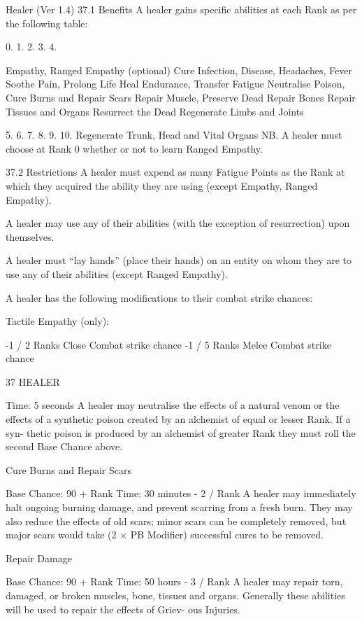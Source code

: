 \begin{Chapter}{Healer (Ver 1.4)}
37.1 Benefits 
A healer gains specific abilities at each Rank as per 
the following table: 

0. 
1. 
2. 
3. 
4. 

Empathy, Ranged Empathy (optional) 
Cure Infection, Disease, Headaches, Fever 
Soothe Pain, Prolong Life 
Heal Endurance, Transfer Fatigue 
Neutralise Poison, Cure Burns and Repair 
Scars 
Repair Muscle, Preserve Dead 
Repair Bones 
Repair Tissues and Organs 
Resurrect the Dead 
Regenerate Limbs and Joints 

5. 
6. 
7. 
8. 
9. 
10.  Regenerate Trunk, Head and Vital Organs 
NB.  A  healer  must  choose  at  Rank  0  whether  or 
not to learn Ranged Empathy. 

37.2 Restrictions 
A  healer  must  expend  as  many  Fatigue  Points  as 
the Rank at which they acquired the ability they are 
using (except Empathy, Ranged Empathy). 

A  healer  may  use  any  of  their  abilities  (with  the 
exception of resurrection) upon themselves. 

A  healer  must  “lay  hands”  (place  their  hands)  on 
an  entity  on  whom  they  are  to  use  any  of  their 
abilities (except Ranged Empathy). 

A  healer  has  the  following  modifications  to  their 
combat strike chances: 

Tactile Empathy (only): 

-1 / 2 Ranks  Close Combat strike chance 
-1 / 5 Ranks  Melee Combat strike chance 

37 HEALER 

Time: 5 seconds 
A  healer  may  neutralise  the  effects  of  a  natural 
venom or  the  effects  of  a  synthetic  poison  created 
by  an  alchemist  of  equal  or  lesser  Rank.  If  a  syn-
thetic poison is produced by an alchemist of greater 
Rank  they  must  roll  the  second  Base  Chance 
above. 

Cure Burns and Repair Scars 

Base Chance: 90 + Rank 
Time: 30 minutes - 2 / Rank 
A  healer  may  immediately  halt  ongoing  burning 
damage,  and  prevent  scarring  from  a  fresh  burn. 
They  may  also  reduce  the  effects  of  old  scars; 
minor scars can be completely removed, but major 
scars  would  take  (2  ×  PB  Modifier)  successful 
cures to be removed. 

Repair Damage 

Base Chance: 90 + Rank 
Time: 50 hours - 3 / Rank 
A  healer  may  repair  torn,  damaged,  or  broken 
muscles, bone, tissues and organs. Generally these 
abilities will be used to repair the effects of Griev-
ous Injuries. 


\end{Chapter}
